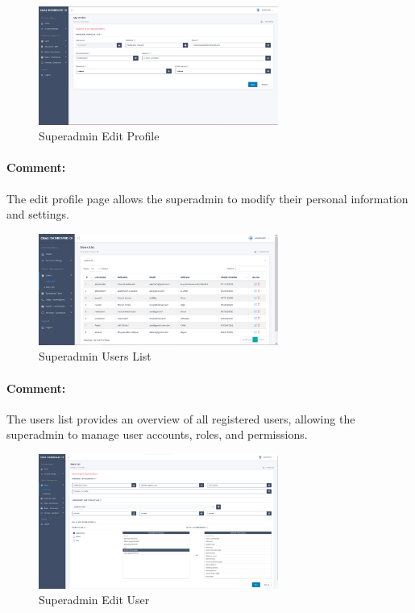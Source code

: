 \begin{itemize}
\begin{figure}[htbp]
  \centering
  \includegraphics[width=0.7\textwidth]{SCREENSHOTS/superadmin/edit_profile.png}
  \caption{Superadmin Edit Profile}
  \label{fig:edit-profile}
\end{figure}
\paragraph{Comment:} The edit profile page allows the superadmin to modify their personal information and settings.
\newpage
\begin{figure}[htbp]
  \centering
  \includegraphics[width=0.7\textwidth]{SCREENSHOTS/superadmin/users_list.png}
  \caption{Superadmin Users List}
  \label{fig:users-list}
\end{figure}
\paragraph{Comment:} The users list provides an overview of all registered users, allowing the superadmin to manage user accounts, roles, and permissions.

\begin{figure}[htbp]
    \centering
    \includegraphics[width=0.7\textwidth]{SCREENSHOTS/superadmin/edit_user.png}
    \caption{Superadmin Edit User}
    \label{fig:edit-user}
  \end{figure}

\end{itemize}

